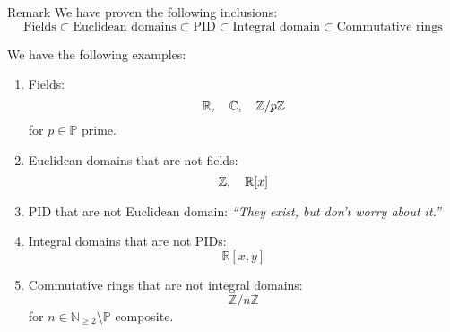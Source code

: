 \documentclass[a4paper]{article}
\begin{document}
\begin{parag}{Remark}
    We have proven the following inclusions: 
    \[\text{Fields} \subset \text{Euclidean domains} \subset \text{PID} \subset \text{Integral domain} \subset \text{Commutative rings}\]
    
    We have the following examples:
    \begin{enumerate}
        \item Fields: 
        \[\mathbb{R}, \quad \mathbb{C}, \quad \mathbb{Z}/p\mathbb{Z}\]
        for $p \in \mathbb{P}$ prime.
        \item Euclidean domains that are not fields: 
        \[\mathbb{Z}, \mathspace \mathbb{R}\left[x\right]\]
        \item PID that are not Euclidean domain: \textit{``They exist, but don't worry about it.''}
        \item Integral domains that are not PIDs:
        \[\mathbb{R}\left[x, y\right]\]
        \item Commutative rings that are not integral domains: 
        \[\mathbb{Z}/n\mathbb{Z}\]
        for $n \in \mathbb{N}_{\geq 2} \setminus \mathbb{P}$ composite.
    \end{enumerate}
\end{parag}
\end{document}
